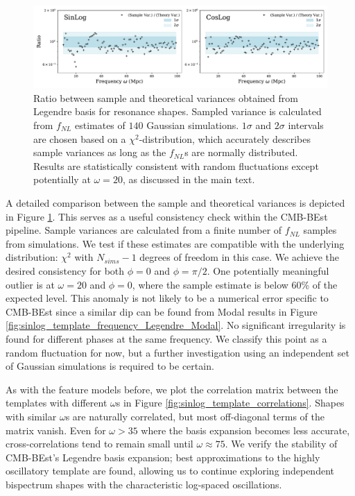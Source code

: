 \begin{figure}[htbp!] 
	\centering    
	\includegraphics[width=\textwidth]{sinlog_template_frequency_variances_Legendre.pdf}
	\caption{Ratio between sample and theoretical variances obtained from Legendre basis for resonance shapes. Sampled variance is calculated from $f_{NL}$ estimates of $140$ Gaussian simulations. $1\sigma$ and $2\sigma$ intervals are chosen based on a $\chi^2$-distribution, which accurately describes sample variances as long as the $f_{NL}$s are normally distributed. Results are statistically consistent with random fluctuations except potentially at $\omega=20$, as discussed in the main text.}
	\label{fig:sinlog_template_frequency_variances_Legendre}
\end{figure}

A detailed comparison between the sample and theoretical variances is depicted in Figure \ref{fig:sinlog_template_frequency_variances_Legendre}. This serves as a useful consistency check within the CMB-BEst pipeline. Sample variances are calculated from a finite number of $f_{NL}$ samples from simulations. We test if these estimates are compatible with the underlying distribution: $\chi^2$ with $N_{sims}-1$ degrees of freedom in this case. We achieve the desired consistency for both $\phi=0$ and $\phi=\pi/2$. One potentially meaningful outlier is at $\omega=20$ and $\phi=0$, where the sample estimate is below 60\% of the expected level. This anomaly is not likely to be a numerical error specific to CMB-BEst since a similar dip can be found from Modal results in Figure \ref{fig:sinlog_template_frequency_Legendre_Modal}. No significant irregularity is found for different phases at the same frequency. We classify this point as a random fluctuation for now, but a further investigation using an independent set of Gaussian simulations is required to be certain.

As with the feature models before, we plot the correlation matrix between the templates with different $\omega$s in Figure \ref{fig:sinlog_template_correlations}. Shapes with similar $\omega$s are naturally correlated, but most off-diagonal terms of the matrix vanish. Even for $\omega > 35$ where the basis expansion becomes less accurate, cross-correlations tend to remain small until $\omega \approx 75$. We verify the stability of CMB-BEst's Legendre basis expansion; best approximations to the highly oscillatory template are found, allowing us to continue exploring independent bispectrum shapes with the characteristic log-spaced oscillations.

